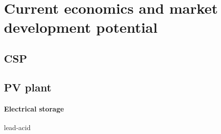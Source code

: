 \chapter{Current economics and market development potential}
\section{CSP}
\cite{Smith2012}

\section{PV plant}

\subsubsection{Electrical storage}
lead-acid





\pagebreak
